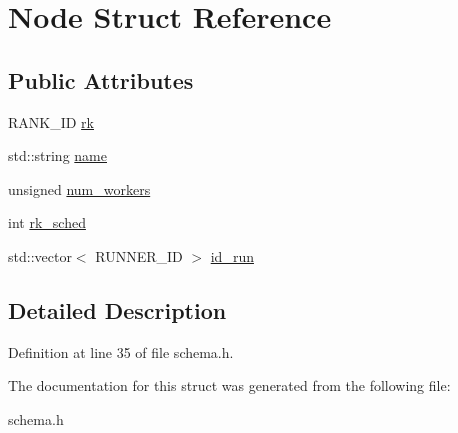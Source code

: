 \hypertarget{structNode}{
\section{Node Struct Reference}
\label{structNode}
}
\subsection*{Public Attributes}
\begin{CompactItemize}
\item 
\hypertarget{structNode_7de6f254b6b8c3f9f8287af0bb742e9b}{
RANK\_\-ID \hyperlink{structNode_7de6f254b6b8c3f9f8287af0bb742e9b}{rk}}
\label{structNode_7de6f254b6b8c3f9f8287af0bb742e9b}

\item 
\hypertarget{structNode_3c4318d71ca9a44fe33edcf8b7f26863}{
std::string \hyperlink{structNode_3c4318d71ca9a44fe33edcf8b7f26863}{name}}
\label{structNode_3c4318d71ca9a44fe33edcf8b7f26863}

\item 
\hypertarget{structNode_01fec86d75332858b158c810d57caee3}{
unsigned \hyperlink{structNode_01fec86d75332858b158c810d57caee3}{num\_\-workers}}
\label{structNode_01fec86d75332858b158c810d57caee3}

\item 
\hypertarget{structNode_98deed2036c3dd8fc0f4fe8dacf56a92}{
int \hyperlink{structNode_98deed2036c3dd8fc0f4fe8dacf56a92}{rk\_\-sched}}
\label{structNode_98deed2036c3dd8fc0f4fe8dacf56a92}

\item 
\hypertarget{structNode_a90013b890888d3d252a71cb4fe48934}{
std::vector$<$ RUNNER\_\-ID $>$ \hyperlink{structNode_a90013b890888d3d252a71cb4fe48934}{id\_\-run}}
\label{structNode_a90013b890888d3d252a71cb4fe48934}

\end{CompactItemize}


\subsection{Detailed Description}




Definition at line 35 of file schema.h.

The documentation for this struct was generated from the following file:\begin{CompactItemize}
\item 
schema.h\end{CompactItemize}
